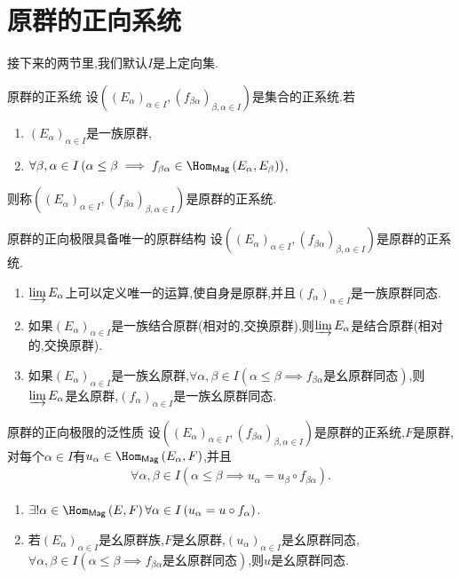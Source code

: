 \section{原群的正向系统}

接下来的两节里,我们默认$I$是上定向集.

\begin{definition}{原群的正系统}{}
	设$\left(\left(E_{\alpha}\right)_{\alpha\in I},\left(f_{\beta\alpha}\right)_{\beta,\alpha\in I}\right)$是集合的正系统.若
	\begin{enumerate}
		\item $\left(E_{\alpha}\right)_{\alpha\in I}$是一族原群,
		\item $\forall\beta,\alpha\in I\left(\alpha\leq\beta\implies f_{\beta\alpha}\in\Hom_{\mathsf{Mag}}\left(E_{\alpha},E_{\beta}\right)\right)$,
	\end{enumerate}
	则称$\left(\left(E_{\alpha}\right)_{\alpha\in I},\left(f_{\beta\alpha}\right)_{\beta,\alpha\in I}\right)$是原群的正系统.
\end{definition}

\begin{proposition}{原群的正向极限具备唯一的原群结构}{}
	设$\left(\left(E_{\alpha}\right)_{\alpha\in I},\left(f_{\beta\alpha}\right)_{\beta,\alpha\in I}\right)$是原群的正系统.
	\begin{enumerate}
		\item $\varinjlim E_{\alpha}$上可以定义唯一的运算,使自身是原群,并且$\left(f_{\alpha}\right)_{\alpha\in I}$是一族原群同态.
		\item 如果$\left(E_{\alpha}\right)_{\alpha\in I}$是一族结合原群(相对的,交换原群),则$\varinjlim E_{\alpha}$是结合原群(相对的,交换原群).
		\item 如果$\left(E_{\alpha}\right)_{\alpha\in I}$是一族幺原群,$\forall\alpha,\beta\in I\left(\alpha\leq\beta\implies f_{\beta\alpha}\text{是幺原群同态}\right)$,则$\varinjlim E_{\alpha}$是幺原群,$\left(f_{\alpha}\right)_{\alpha\in I}$是一族幺原群同态.
	\end{enumerate}
\end{proposition}

\begin{proposition}{原群的正向极限的泛性质}{}
	设$\left(\left(E_{\alpha}\right)_{\alpha\in I},\left(f_{\beta\alpha}\right)_{\beta,\alpha\in I}\right)$是原群的正系统,$F$是原群,对每个$\alpha\in I$有$u_{\alpha}\in\Hom_{\mathsf{Mag}}\left(E_{\alpha},F\right)$,并且
	\begin{align*}
		\forall\alpha,\beta\in I\left(\alpha\leq\beta\implies u_{\alpha}=u_{\beta}\circ f_{\beta\alpha}\right).
	\end{align*}
	\begin{enumerate}
		\item $\exists!\alpha\in\Hom_{\mathsf{Mag}}\left(E,F\right)\forall\alpha\in I\left(u_{\alpha}=u\circ f_{\alpha}\right)$.
		\item 若$\left(E_{\alpha}\right)_{\alpha\in I}$是幺原群族,$F$是幺原群,$\left(u_{\alpha}\right)_{\alpha\in I}$是幺原群同态,$\forall\alpha,\beta\in I\left(\alpha\leq\beta\implies f_{\beta\alpha}\text{是幺原群同态}\right)$,则$u$是幺原群同态.
	\end{enumerate}
\end{proposition}

